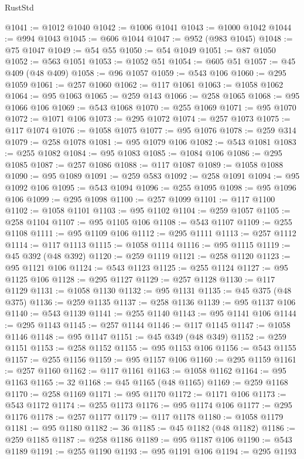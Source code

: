\begin{lexlean}{RustStd}
\begin{coremodule}
{\begin{coremodule}
{{{{{{{{{{{{{{{{{{{{{{{{{{{{{{{{{{{{{{{@1041 := @1012 @1040
@1042 := @1006 @1041
@1043 := @1000 @1042
@1044 := @994 @1043
@1045 := @606 @1044
@1047 := @952 (@983 @1045)
@1048 := @75 @1047
@1049 := @54 @55
@1050 := @54 @1049
@1051 := @87 @1050
@1052 := @563 @1051
@1053 := @1052 @51
@1054 := @605 @51
@1057 := @45 @409 (@48 @409)
@1058 := @96 @1057
@1059 := @543 @106
@1060 := @295 @1059
@1061 := @257 @1060
@1062 := @117 @1061
@1063 := @1058 @1062
@1064 := @95 @1063
@1065 := @259 @143
@1066 := @258 @1065
@1068 := @95 @1066 @106
@1069 := @543 @1068
@1070 := @255 @1069
@1071 := @95 @1070
@1072 := @1071 @106
@1073 := @295 @1072
@1074 := @257 @1073
@1075 := @117 @1074
@1076 := @1058 @1075
@1077 := @95 @1076
@1078 := @259 @314
@1079 := @258 @1078
@1081 := @95 @1079 @106
@1082 := @543 @1081
@1083 := @255 @1082
@1084 := @95 @1083
@1085 := @1084 @106
@1086 := @295 @1085
@1087 := @257 @1086
@1088 := @117 @1087
@1089 := @1058 @1088
@1090 := @95 @1089
@1091 := @259 @583
@1092 := @258 @1091
@1094 := @95 @1092 @106
@1095 := @543 @1094
@1096 := @255 @1095
@1098 := @95 @1096 @106
@1099 := @295 @1098
@1100 := @257 @1099
@1101 := @117 @1100
@1102 := @1058 @1101
@1103 := @95 @1102
@1104 := @259 @1057
@1105 := @258 @1104
@1107 := @95 @1105 @106
@1108 := @543 @1107
@1109 := @255 @1108
@1111 := @95 @1109 @106
@1112 := @295 @1111
@1113 := @257 @1112
@1114 := @117 @1113
@1115 := @1058 @1114
@1116 := @95 @1115
@1119 := @45 @392 (@48 @392)
@1120 := @259 @1119
@1121 := @258 @1120
@1123 := @95 @1121 @106
@1124 := @543 @1123
@1125 := @255 @1124
@1127 := @95 @1125 @106
@1128 := @295 @1127
@1129 := @257 @1128
@1130 := @117 @1129
@1131 := @1058 @1130
@1132 := @95 @1131
@1135 := @45 @375 (@48 @375)
@1136 := @259 @1135
@1137 := @258 @1136
@1139 := @95 @1137 @106
@1140 := @543 @1139
@1141 := @255 @1140
@1143 := @95 @1141 @106
@1144 := @295 @1143
@1145 := @257 @1144
@1146 := @117 @1145
@1147 := @1058 @1146
@1148 := @95 @1147
@1151 := @45 @349 (@48 @349)
@1152 := @259 @1151
@1153 := @258 @1152
@1155 := @95 @1153 @106
@1156 := @543 @1155
@1157 := @255 @1156
@1159 := @95 @1157 @106
@1160 := @295 @1159
@1161 := @257 @1160
@1162 := @117 @1161
@1163 := @1058 @1162
@1164 := @95 @1163
@1165 := 32
@1168 := @45 @1165 (@48 @1165)
@1169 := @259 @1168
@1170 := @258 @1169
@1171 := @95 @1170
@1172 := @1171 @106
@1173 := @543 @1172
@1174 := @255 @1173
@1176 := @95 @1174 @106
@1177 := @295 @1176
@1178 := @257 @1177
@1179 := @117 @1178
@1180 := @1058 @1179
@1181 := @95 @1180
@1182 := 36
@1185 := @45 @1182 (@48 @1182)
@1186 := @259 @1185
@1187 := @258 @1186
@1189 := @95 @1187 @106
@1190 := @543 @1189
@1191 := @255 @1190
@1193 := @95 @1191 @106
@1194 := @295 @1193
}}}}}}}}}}}}}}}}}}}}}}}}}}}}}}}}}}}}}}}
\end{coremodule}}
\end{coremodule}
\end{lexlean}
